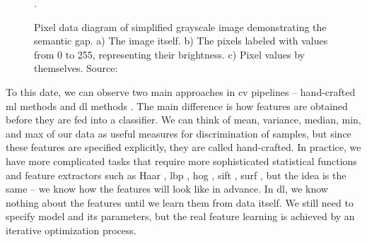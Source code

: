         \begin{figure}[h]
            \centering
            \qquad
            \qquad
            \caption{Pixel data diagram of simplified grayscale image demonstrating the semantic gap. a) The image itself. b) The pixels labeled with values from 0 to 255, representing their brightness. c) Pixel values by themselves. Source: \cite{computervisiongolan}}.
            \label{fig:lincon_pixels}
        \end{figure}
        
        To this date, we can observe two main approaches in \gls{cv} pipelines -- hand-crafted \gls{ml} methods and \gls{dl} methods \cite{goodfellow2016deep}. The main difference is how features are obtained before they are fed into a classifier. We can think of mean, variance, median, min, and max of our data as useful measures for discrimination of samples, but since these features are specified explicitly, they are called hand-crafted. In practice, we have more complicated tasks that require more sophisticated statistical functions and feature extractors such as Haar \cite{viola2001rapid}, \gls{lbp} \cite{ojala2002multiresolution}, \gls{hog} \cite{dalal2005histograms}, \gls{sift} \cite{lowe2004method}, \gls{surf} \cite{bay2006surf}, but the idea is the same -- we know how the features will look like in advance. In \gls{dl}, we know nothing about the features until we learn them from data itself. We still need to specify model and its parameters, but the real feature learning is achieved by an iterative optimization process.
        
